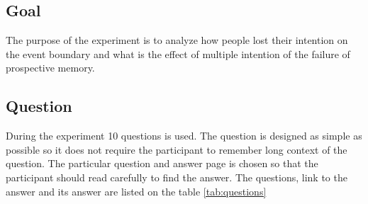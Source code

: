 \subsection{Goal}
The purpose of the experiment is to analyze how people lost their intention on the event boundary and what is the effect of multiple intention of the failure of prospective memory.

\subsection{Question}
During the experiment 10 questions is used. The question is designed as simple as possible so it does not require the participant to remember long context of the question. The particular question and answer page is chosen so that the participant should read carefully to find the answer.
The questions, link to the answer and its answer are listed on the table \ref{tab:questions}


